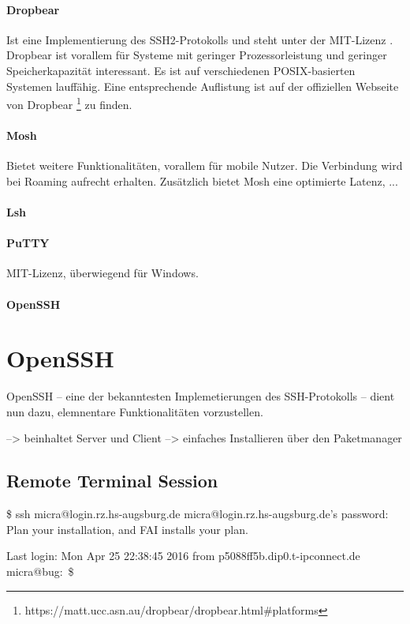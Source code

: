 \documentclass[ngerman,pdf]{wkcms}    %
\begin{document}
\paragraph{Dropbear} Ist eine Implementierung des SSH2-Protokolls und steht unter der MIT-Lizenz \cite{dropbear}. Dropbear ist vorallem für Systeme mit geringer Prozessorleistung und geringer Speicherkapazität interessant. Es ist auf verschiedenen POSIX-basierten Systemen lauffähig. Eine entsprechende Auflistung ist auf der offiziellen Webseite von Dropbear \footnote{https://matt.ucc.asn.au/dropbear/dropbear.html\#platforms} zu finden.

\paragraph{Mosh} Bietet weitere Funktionalitäten, vorallem für mobile Nutzer. Die Verbindung wird bei Roaming aufrecht erhalten. Zusätzlich bietet Mosh eine optimierte Latenz, \Dh ...
\paragraph{Lsh}
\paragraph{PuTTY} MIT-Lizenz, überwiegend für Windows.
\paragraph{OpenSSH}




\section{OpenSSH}

OpenSSH -- eine der bekanntesten Implemetierungen des SSH-Protokolls -- dient nun dazu,
elemnentare Funktionalitäten vorzustellen. 

--> beinhaltet Server und Client
--> einfaches Installieren über den Paketmanager

\subsection{Remote Terminal Session}

\begin{program}
\$ ssh micra@login.rz.hs-augsburg.de
micra@login.rz.hs-augsburg.de's password:
Plan your installation, and FAI installs your plan.

Last login: Mon Apr 25 22:38:45 2016
from p5088ff5b.dip0.t-ipconnect.de
micra@bug:~\$

\end{program}
\end{document}
